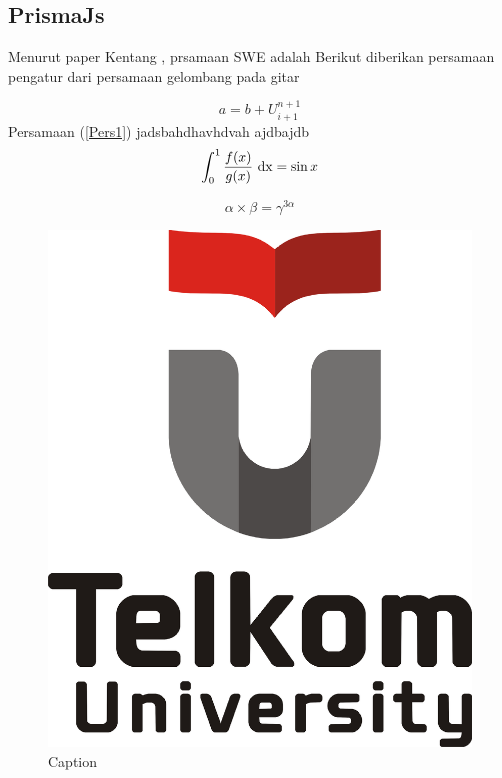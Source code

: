 \subsection{PrismaJs}
Menurut paper Kentang \cite{Kentang}, prsamaan SWE adalah
Berikut diberikan persamaan pengatur dari persamaan gelombang pada gitar

\begin{equation}\label{Pers1}
    a=b+U^{n+1}_{i+1}
\end{equation}
Persamaan (\ref{Pers1}) jadsbahdhavhdvah ajdbajdb
\begin{equation}\label{nama-rumus}
    \int_0^1 \frac{f(x)}{g(x)}\ {\rm dx}=\sin x
\end{equation}

\begin{equation}\label{nama-rumus1}
   \alpha \times \beta =\gamma^{3\alpha}
\end{equation}

\begin{figure}[h!]
    \centering
    \includegraphics[scale=0.1]{Tel-U-Logo.png}
    \caption{Caption}
    \label{fig:my_label1}
\end{figure} 

